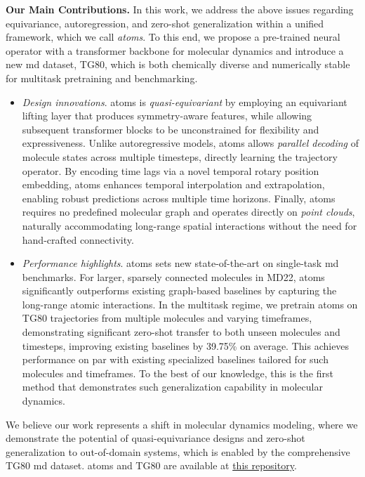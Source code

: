 \textbf{Our Main Contributions.} In this work, we address the above issues regarding equivariance, autoregression, and zero-shot generalization within a unified framework, which we call \textit{\gls{atoms}}. To this end, we propose a pre-trained neural operator with a transformer backbone for molecular dynamics and introduce a new \gls{md} dataset, TG80, which is both chemically diverse and numerically stable for multitask pretraining and benchmarking. 
\begin{itemize}[leftmargin=0.15in]
    \item \textit{Design innovations}. \gls{atoms} is \textit{quasi-equivariant} by employing an equivariant lifting layer that produces symmetry-aware features, while allowing subsequent transformer blocks to be unconstrained for flexibility and expressiveness. 
    Unlike autoregressive models, \gls{atoms} allows \textit{parallel decoding} of molecule states across multiple timesteps, directly learning the trajectory operator. By encoding time lags via a novel temporal rotary position embedding, \gls{atoms} enhances temporal interpolation and extrapolation, enabling robust predictions across multiple time horizons. Finally, \gls{atoms} requires no predefined molecular graph and operates directly on \textit{point clouds}, naturally accommodating long-range spatial interactions without the need for hand-crafted connectivity. 

    \item \textit{Performance highlights}. \gls{atoms} sets new state-of-the-art on single-task \gls{md} benchmarks. For larger, sparsely connected molecules in MD22, \gls{atoms} significantly outperforms existing graph-based baselines by capturing the long-range atomic interactions. In the multitask regime, we pretrain \gls{atoms} on TG80 trajectories from multiple molecules and varying timeframes, demonstrating significant zero-shot transfer to both unseen molecules and timesteps, improving existing baselines by 39.75\% on average. This achieves performance on par with existing specialized baselines tailored for such molecules and timeframes.  To the best of our knowledge, this is the first method that demonstrates such generalization capability in molecular dynamics.
\end{itemize}

We believe our work represents a shift in molecular dynamics modeling, where we demonstrate the potential of quasi-equivariance designs and zero-shot generalization to out-of-domain systems, which is enabled by the comprehensive TG80 \gls{md} dataset. \gls{atoms} and TG80 are available at \href{https://github.com/luke-a-thompson/ATOM}{this repository}.


